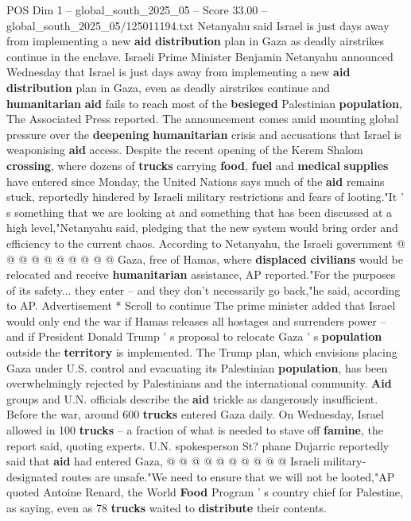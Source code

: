 \begin{textsample}{POS Dim 1 – global\_south\_2025\_05 – Score 33.00 – global\_south\_2025\_05/125011194.txt}  \label{ex:f1_pos_063}
Netanyahu said Israel is just days away from implementing a new \textbf{aid} \textbf{distribution} plan in Gaza as deadly airstrikes continue in the enclave.
Israeli Prime Minister Benjamin Netanyahu announced Wednesday that Israel is just days away from implementing a new \textbf{aid} \textbf{distribution} plan in Gaza, even as deadly airstrikes continue and \textbf{humanitarian} \textbf{aid} fails to reach most of the \textbf{besieged} Palestinian \textbf{population}, The Associated Press reported.
The announcement comes amid mounting global pressure over the \textbf{deepening} \textbf{humanitarian} crisis and accusations that Israel is weaponising \textbf{aid} access.
Despite the recent opening of the Kerem Shalom \textbf{crossing}, where dozens of \textbf{trucks} carrying \textbf{food}, \textbf{fuel} and \textbf{medical} \textbf{supplies} have entered since Monday, the United Nations says much of the \textbf{aid} remains stuck, reportedly hindered by Israeli military restrictions and fears of looting."It ' s something that we are looking at and something that has been discussed at a high level,"Netanyahu said, pledging that the new system would bring order and efficiency to the current chaos.
According to Netanyahu, the Israeli government @ @ @ @ @ @ @ @ @ @ Gaza, free of Hamas, where \textbf{displaced} \textbf{civilians} would be relocated and receive \textbf{humanitarian} assistance, AP reported."For the purposes of its safety... they enter -- and they don't necessarily go back,"he said, according to AP.
Advertisement * Scroll to continue The prime minister added that Israel would only end the war if Hamas releases all hostages and surrenders power -- and if President Donald Trump ' s proposal to relocate Gaza ' s \textbf{population} outside the \textbf{territory} is implemented.
The Trump plan, which envisions placing Gaza under U.S. control and evacuating its Palestinian \textbf{population}, has been overwhelmingly rejected by Palestinians and the international community. \textbf{Aid} groups and U.N. officials describe the \textbf{aid} trickle as dangerously insufficient.
Before the war, around 600 \textbf{trucks} entered Gaza daily.
On Wednesday, Israel allowed in 100 \textbf{trucks} -- a fraction of what is needed to stave off \textbf{famine}, the report said, quoting experts.
U.N. spokesperson St? phane Dujarric reportedly said that \textbf{aid} had entered Gaza, @ @ @ @ @ @ @ @ @ @ Israeli military-designated routes are unsafe."We need to ensure that we will not be looted,"AP quoted Antoine Renard, the World \textbf{Food} Program ' s country chief for Palestine, as saying, even as 78 \textbf{trucks} waited to \textbf{distribute} their contents.

\end{textsample}
